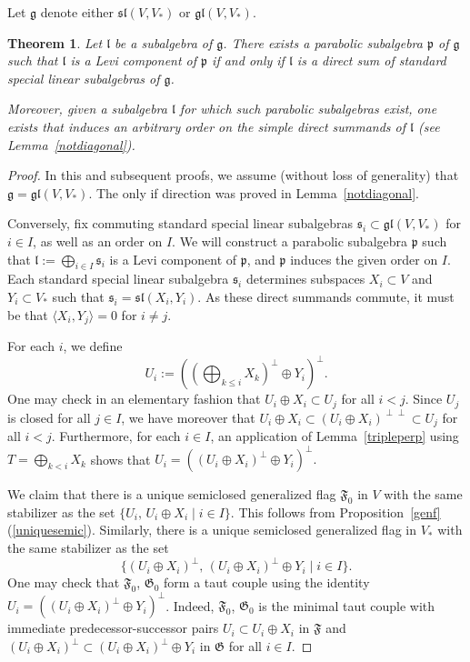 \documentclass{amsart}
\newtheorem{theorem}{Theorem}[section]
\theoremstyle{definition}
\theoremstyle{remark}
\numberwithin{equation}{section}
\def\gl{\mathfrak {gl}}
\def\g{\mathfrak {g}}
\def\l{\mathfrak {l}}
\def\p{\mathfrak {p}}
\def\sl{\mathfrak{sl}}
\def\s{\mathfrak{s}}
\def\F{\mathfrak{F}}
\def\G{\mathfrak{G}}
\begin{document}
Let $\g$ denote either $\sl(V,V_*)$ or $\gl(V,V_*)$.


\begin{theorem} \label{firstcharacterization}
Let $\l$ be a subalgebra of $\g$.  There exists a parabolic subalgebra $\p$ of $\g$ such that $\l$ is a Levi component of $\p$ if and only if $\l$ is a direct sum of standard special linear subalgebras of $\g$.  

Moreover, given a subalgebra $\l$ for which such parabolic subalgebras exist, one exists that induces an arbitrary order on the simple direct summands of $\l$ (see Lemma~\ref{notdiagonal}).
\end{theorem}


\begin{proof}
In this and subsequent proofs, we assume (without loss of generality) that $\g = \gl(V,V_*)$.  The only if direction was proved in Lemma~\ref{notdiagonal}.  

Conversely, fix commuting standard special linear subalgebras $\s_i \subset \gl(V,V_*)$ for $i \in I$, as well as an order on $I$.  We will construct a parabolic subalgebra $\p$ such that $\l := \bigoplus_{i \in I} \s_i$ is a Levi component of $\p$, and $\p$ induces the given order on $I$.  Each standard special linear subalgebra $\s_i$ determines subspaces $X_i \subset V$ and $Y_i \subset V_*$ such that $\s_i = \sl(X_i , Y_i)$.  As these direct summands commute, it must be that $\langle X_i , Y_j \rangle = 0$ for $i \neq j$.

For each $i$, we define $$U_i := (( \bigoplus_{k \leq i} X_k)^\perp \oplus Y_i)^\perp.$$
One may check in an elementary fashion that $U_i \oplus X_i \subset U_j$ for all $i < j$.  Since $U_j$ is closed for all $j \in I$, we have moreover that $U_i \oplus X_i \subset (U_i \oplus X_i)^{\perp \perp} \subset U_j$ for all $i < j$.  Furthermore, for each $i \in I$, an application of Lemma~\ref{tripleperp} using $T = \bigoplus_{k<i} X_k$ shows that
$U_i = ((U_i \oplus X_i)^\perp \oplus Y_i)^\perp.$

We claim that there is a unique semiclosed generalized flag $\F_0$ in $V$ with the same stabilizer as the set $\{ U_i , \, U_i \oplus X_i \mid i \in I \}$.  This follows from Proposition~\ref{genf} (\ref{uniquesemic}).
Similarly, there is a unique semiclosed generalized flag in $V_*$ with the same stabilizer as the set
$$\{ (U_i \oplus X_i)^\perp , \, (U_i \oplus X_i)^\perp \oplus Y_i \mid i \in I \}.$$
One may check that $\F_0$, $\G_0$ form a taut couple using the identity $U_i = ((U_i \oplus X_i)^\perp \oplus Y_i)^\perp$.
Indeed, $\F_0$, $\G_0$ is the minimal taut couple with immediate predecessor-successor pairs $U_i \subset U_i \oplus X_i$ in $\F$ and $(U_i \oplus X_i)^\perp \subset (U_i \oplus X_i)^\perp \oplus Y_i$ in $\G$ for all $i \in I$.


\end{proof}
\end{document}
